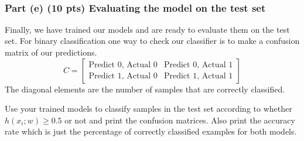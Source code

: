 \documentclass[11pt]{article}
\begin{document}
    \begin{center}
    \end{center}
    { \hspace*{\fill} \\}
    
    \hypertarget{part-e-10-pts-evaluating-the-model-on-the-test-set}{%
\subsubsection{Part (e) (10 pts) Evaluating the model on the test
set}\label{part-e-10-pts-evaluating-the-model-on-the-test-set}}

Finally, we have trained our models and are ready to evaluate them on
the test set. For binary classification one way to check our classifier
is to make a confusion matrix of our predictions. \[
C = \begin{bmatrix}
\text{Predict 0, Actual 0} & \text{Predict 0, Actual 1}\\
\text{Predict 1, Actual 0} & \text{Predict 1, Actual 1}
\end{bmatrix}
\] The diagonal elements are the number of samples that are correctly
classified.

Use your trained models to classify samples in the test set according to
whether \(h(x_i; w) \ge 0.5\) or not and print the confusion matrices.
Also print the accuracy rate which is just the percentage of correctly
classified examples for both models.
\end{document}
